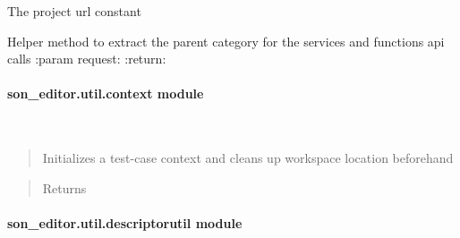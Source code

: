 \documentclass[letterpaper,10pt,english]{sphinxmanual}
\begin{document}
\begin{fulllineitems}
\label{_source/son_editor.util:son_editor.util.constants.WORKSPACES}
The project url constant

\end{fulllineitems}


\begin{fulllineitems}
\label{_source/son_editor.util:son_editor.util.constants.get_parent}
Helper method to extract the parent category
for the services and functions api calls
:param request:
:return:

\end{fulllineitems}



\paragraph{son\_editor.util.context module}
\label{_source/son_editor.util:module-son_editor.util.context}\label{_source/son_editor.util:son-editor-util-context-module}

\begin{fulllineitems}
\label{_source/son_editor.util:son_editor.util.context.init_test_context}~\begin{quote}

Initializes a test-case context and cleans up workspace location beforehand
\end{quote}
\begin{quote}\begin{description}
\item[{Returns}] \leavevmode


\end{description}\end{quote}

\end{fulllineitems}



\paragraph{son\_editor.util.descriptorutil module}
\label{_source/son_editor.util:son-editor-util-descriptorutil-module}\label{_source/son_editor.util:module-son_editor.util.descriptorutil}
\end{document}
